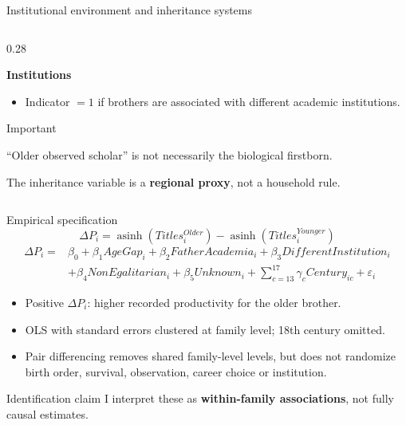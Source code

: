 \documentclass[aspectratio=169,10pt]{beamer}
\begin{document}
\begin{frame}{Institutional environment and inheritance systems}
\begin{columns}[T,onlytextwidth]
\begin{column}{0.28\textwidth}
\vspace{0.08em}

\textbf{Institutions}

\begin{itemize}
    \setlength{\itemsep}{0.10em}
    \setlength{\leftmargini}{1.15em}

    \item Indicator \(=1\) if brothers are associated with
    different academic institutions.
\end{itemize}

\vspace{0.08em}

\begin{alertblock}{Important}
\scriptsize

``Older observed scholar'' is not necessarily the biological firstborn.

\vspace{0.08em}

The inheritance variable is a \textbf{regional proxy},
not a household rule.
\end{alertblock}

\end{column}

\end{columns}

\end{frame}

\begin{frame}{Empirical specification}
\small
\[
\Delta P_i =
\operatorname{asinh}(Titles^{Older}_i)-
\operatorname{asinh}(Titles^{Younger}_i)
\]
\vspace{-0.3em}
\[
\begin{aligned}
\Delta P_i ={}& \beta_0+\beta_1 AgeGap_i+\beta_2 FatherAcademia_i
+\beta_3 DifferentInstitution_i\\
&+\beta_4 NonEgalitarian_i+\beta_5 Unknown_i
+\sum_{c=13}^{17}\gamma_c Century_{ic}+\varepsilon_i
\end{aligned}
\]
\vspace{-0.5em}
\begin{itemize}\setlength\itemsep{0.25em}
  \item Positive \(\Delta P_i\): higher recorded productivity for the older brother.
  \item OLS with standard errors clustered at family level; 18th century omitted.
  \item Pair differencing removes shared family-level levels, but does not randomize birth order, survival, observation, career choice or institution.
\end{itemize}
\vspace{-0.2em}
\begin{alertblock}{Identification claim}
I interpret these as \textbf{within-family associations}, not fully causal estimates.
\end{alertblock}
\end{frame}
\end{document}
